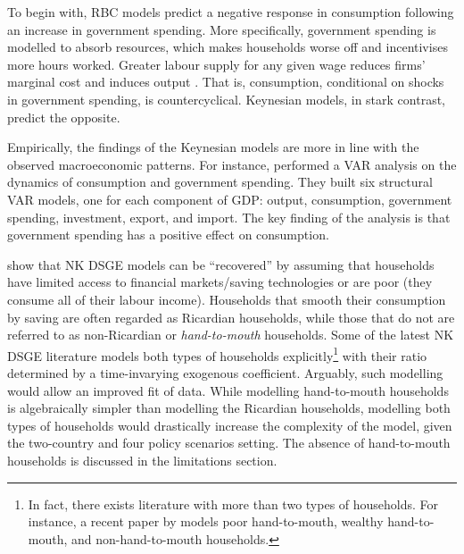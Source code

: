 To begin with, RBC models predict a negative response in consumption following an increase in government spending. More specifically, government spending is modelled to absorb resources, which makes households worse off and incentivises more hours worked. Greater labour supply for any given wage reduces firms' marginal cost and induces output \parencite[319]{baxter_1993_fiscal}. That is, consumption, conditional on shocks in government spending, is countercyclical. Keynesian models, in stark contrast, predict the opposite.

Empirically, the findings of the Keynesian models are more in line with the observed macroeconomic patterns. For instance, \textcite{blanchard_2002_an} performed a VAR analysis on the dynamics of consumption and government spending. They built six structural VAR models, one for each component of GDP: output, consumption, government spending, investment, export, and import. The key finding of the analysis is that government spending has a positive effect on consumption. 

\textcite{jordigal_2005_understanding} show that NK DSGE models can be ``recovered'' by assuming that households have limited access to financial markets/saving technologies or are poor (they consume all of their labour income). Households that smooth their consumption by saving are often regarded as Ricardian households, while those that do not are referred to as non-Ricardian or \textit{hand-to-mouth} households. Some of the latest NK DSGE literature models both types of households explicitly\footnote{In fact, there exists literature with more than two types of households. For instance, a recent paper by \textcite{eskelinen_2021_monetary} models poor hand-to-mouth, wealthy hand-to-mouth, and non-hand-to-mouth households.} with their ratio determined by a time-invarying exogenous coefficient. Arguably, such modelling would allow an improved fit of data. While modelling hand-to-mouth households is algebraically simpler than modelling the Ricardian households, modelling both types of households would drastically increase the complexity of the model, given the two-country and four policy scenarios setting. The absence of hand-to-mouth households is discussed in the limitations section.